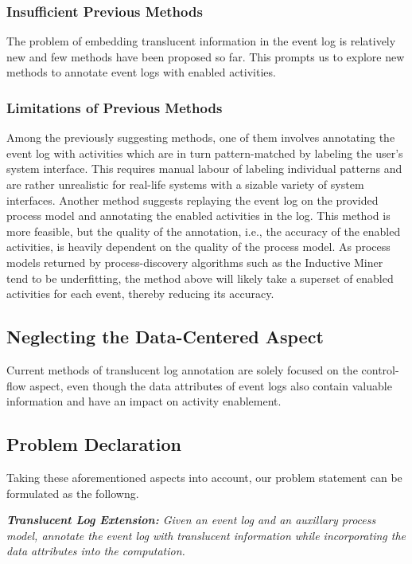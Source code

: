 \subsubsection*{Insufficient Previous Methods}
The problem of embedding translucent information in the event log is relatively new and few methods have been proposed so far. This prompts us to explore new methods to annotate event logs with enabled activities.

\subsubsection*{Limitations of Previous Methods}
Among the previously suggesting methods, one of them involves annotating the event log with activities which are in turn pattern-matched by labeling the user's system interface. This requires manual labour of labeling individual patterns and are rather unrealistic for real-life systems with a sizable variety of system interfaces. Another method suggests replaying the event log on the provided process model and annotating the enabled activities in the log. This method is more feasible, but the quality of the annotation, i.e., the accuracy of the enabled activities, is heavily dependent on the quality of the process model. As process models returned by process-discovery algorithms such as the Inductive Miner tend to be underfitting, the method above will likely take a superset of enabled activities for each event, thereby reducing its accuracy.

\subsection*{Neglecting the Data-Centered Aspect}
Current methods of translucent log annotation are solely focused on the control-flow aspect, even though the data attributes of event logs also contain valuable information and have an impact on activity enablement.  

\subsection{Problem Declaration}

Taking these aforementioned aspects into account, our problem statement can be formulated as the followng.

\begin{center}
	\emph{\textbf{Translucent Log Extension:} Given an event log and an auxillary process model, annotate the event log with translucent information while incorporating the data attributes into the computation.}
\end{center}

